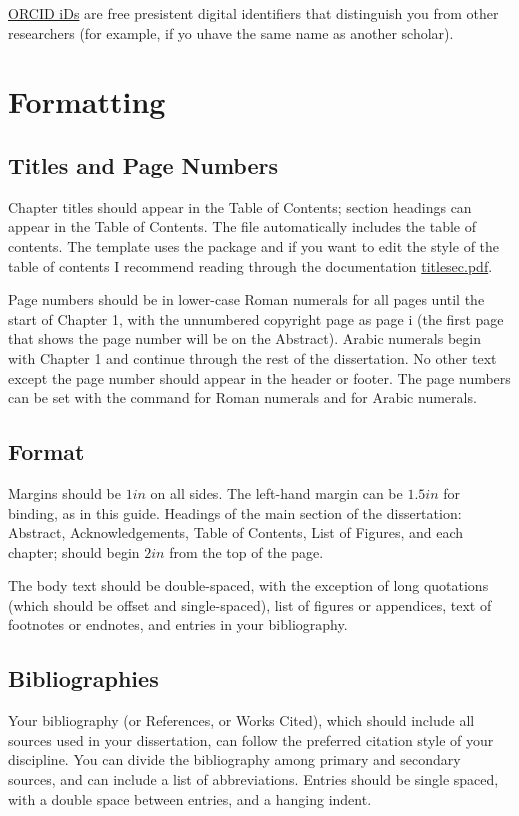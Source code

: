 \documentclass[12pt]{report}
\begin{document}
\href{https://orcid.org/}{ORCID iDs} are free presistent digital identifiers that distinguish you from other researchers (for example, if yo uhave the same name as another scholar).
\newpage
\chapter{Formatting}
\section{Titles and Page Numbers}
Chapter titles should appear in the Table of Contents; section headings can appear in the Table of Contents. The  file automatically includes the table of contents. The template uses the  package and if you want to edit the style of the table of contents I recommend reading through the documentation \href{https://github.com/cacsphysics/BMC_Template_Info_Files/blob/main/titlesec.pdf}{titlesec.pdf}. 

Page numbers should be in lower-case Roman numerals for all pages until the start of Chapter 1, with the unnumbered copyright page as page i (the first page that shows the page number will be on the Abstract). Arabic numerals begin with Chapter 1 and continue through the rest of the dissertation. No other text except the page number should appear in the header or footer. The page numbers can be set with the command  for Roman numerals and  for Arabic numerals.
\section{Format}
Margins should be $1in$ on all sides. The left-hand margin can be $1.5in$ for binding, as in this guide. Headings of the main section of the dissertation: Abstract, Acknowledgements, Table of Contents, List of Figures, and each chapter; should begin $2in$ from the top of the page.

The body text should be double-spaced, with the exception of long quotations (which should be offset and single-spaced), list of figures or appendices, text of footnotes or endnotes, and entries in your bibliography.
\section{Bibliographies}
Your bibliography (or References, or Works Cited), which should include all sources used in your dissertation, can follow the preferred citation style of your discipline. You can divide the bibliography among primary and secondary sources, and can include a list of abbreviations. Entries should be single spaced, with a double space between entries, and a hanging indent.~\parencite{schaffner_temporal_2014, batchelor_1953}
\end{document}
